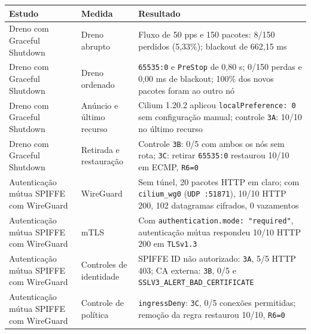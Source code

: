 \documentclass[12pt,openany,oneside,a4paper,chapter=TITLE,english,brazil]{abntex2}
\begin{document}
\begin{quadro}[!htbp]
\caption{Resultados de dreno e autenticação}
\footnotesize
\begin{tabularx}{\textwidth}{|>{\raggedright\arraybackslash\hsize=0.888\hsize}X|>{\raggedright\arraybackslash\hsize=0.697\hsize}X|>{\raggedright\arraybackslash\hsize=1.415\hsize}X|}
\hline
\textbf{Estudo} & \textbf{Medida} & \textbf{Resultado} \\
\hline
Dreno com Graceful Shutdown & Dreno abrupto & Fluxo de 50 pps e 150 pacotes: 8/150 perdidos (5,33\%); blackout de
662,15 ms \\
\hline
Dreno com Graceful Shutdown & Dreno ordenado & \texttt{65535:\allowbreak{}0} e \texttt{Pre\allowbreak{}Stop} de 0,80 s;
0/150 perdas e 0,00 ms de blackout; 100\% dos novos pacotes foram ao
outro nó \\
\hline
Dreno com Graceful Shutdown & Anúncio e último recurso & Cilium 1.20.2 aplicou
\texttt{local\allowbreak{}Preference:\allowbreak{} 0} sem configuração
manual; controle \texttt{3A}: 10/10 no último recurso \\
\hline
Dreno com Graceful Shutdown & Retirada e restauração & Controle \texttt{3B}: 0/5 com ambos os nós sem rota; \texttt{3C}:
retirar \texttt{65535:\allowbreak{}0} restaurou 10/10 em ECMP,
\texttt{R6=\allowbreak{}0} \\
\hline
Autenticação mútua SPIFFE com WireGuard & WireGuard & Sem túnel, 20 pacotes HTTP em claro; com
\texttt{cilium\_\allowbreak{}wg0} (\texttt{UDP :\allowbreak{}51871}),
10/10 HTTP 200, 102 datagramas cifrados, 0 vazamentos \\
\hline
Autenticação mútua SPIFFE com WireGuard & mTLS & Com \texttt{authentication.\allowbreak{}mode:\allowbreak{} "required"},
autenticação mútua respondeu 10/10 HTTP 200 em
\texttt{TLSv1.\allowbreak{}3} \\
\hline
Autenticação mútua SPIFFE com WireGuard & Controles de identidade & SPIFFE ID não autorizado: \texttt{3A}, 5/5 HTTP 403; CA externa:
\texttt{3B}, 0/5 e
\texttt{SSLV3\_\allowbreak{}ALERT\_\allowbreak{}BAD\_\allowbreak{}CERTIFICATE} \\
\hline
Autenticação mútua SPIFFE com WireGuard & Controle de política & \texttt{ingress\allowbreak{}Deny}: \texttt{3C}, 0/5 conexões permitidas;
remoção da regra restaurou 10/10, \texttt{R6=\allowbreak{}0} \\
\hline
\end{tabularx}
\end{quadro}
\end{document}
